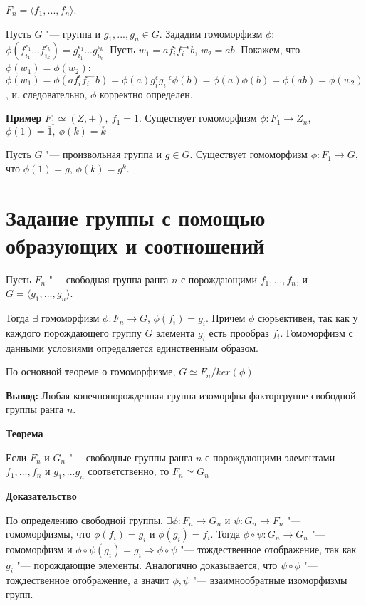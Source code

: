 \documentclass{article}
\begin{document}
$F_n = \langle f_1, ..., f_n \rangle$.

Пусть $G$ "--- группа и $g_1, ..., g_n \in G$. Зададим гомоморфизм $\phi$: $\phi(f_{i_1}^{\epsilon_1}...f_{i_k}^{\epsilon_k}) = g_{i_1}^{\epsilon_1}...g_{i_k}^{\epsilon_k}$. Пусть $w_1 = af_i^{\epsilon}f_i^{-\epsilon}b$, $w_2 = ab$. Покажем, что $\phi(w_1) = \phi(w_2)$: $\phi(w_1) = \phi(af_i^{\epsilon}f_i^{-\epsilon}b) = \phi(a)g_i^{\epsilon}g_i^{-\epsilon}\phi(b) = \phi(a)\phi(b) = \phi(ab) = \phi(w_2)$, и, следовательно, $\phi$ корректно определен.

\vspace{10pt}

\textbf{Пример}
$F_1 \simeq (Z, +), \  f_1 = 1$. Существует гомоморфизм $\phi: F_1 \rightarrow Z_n$, $\phi(1) = \overline{1}, \  \phi(k) = \overline{k}$

Пусть $G$ "--- произвольная группа и $g \in G$. Существует гомоморфизм $\phi: F_1 \rightarrow G$, что $\phi(1) = g$, $\phi(k) = g^k$.

\section{Задание группы с помощью образующих и соотношений}

Пусть $F_n$ "--- свободная группа ранга $n$ с порождающими $f_1, ..., f_n$, и $G = \langle g_1, ..., g_n \rangle$.

Тогда $\exists$ гомоморфизм $\phi: F_n \rightarrow G$, $\phi(f_i) = g_i$. Причем $\phi$ сюрьективен, так как у каждого порождающего группу $G$ элемента $g_i$ есть прообраз $f_i$. Гомоморфизм с данными условиями определяется единственным образом.

По основной теореме о гомоморфизме, $G \simeq F_n/ker(\phi)$

\textbf{Вывод:} Любая конечнопорожденная группа изоморфна факторгруппе свободной группы ранга $n$.

\vspace{10pt}

\textbf{Теорема}

Если $F_n$ и $G_n$ "--- свободные группы ранга $n$ с порождающими элементами $f_1, ..., f_n$ и $g_1, ... g_n$ соответственно, то $F_n \simeq G_n$

\textbf{Доказательство}

По определению свободной группы, $\exists \phi: F_n \rightarrow G_n$ и $\psi: G_n \rightarrow F_n$ "--- гомоморфизмы, что $\phi(f_i) = g_i$ и $\phi(g_i) = f_i$. Тогда $\phi \circ \psi: G_n \rightarrow G_n$ "--- гомоморфизм и $\phi \circ \psi(g_i) = g_i \Rightarrow \phi \circ \psi$ "--- тождественное отображение, так как $g_i$ "--- порождающие элементы. Аналогично доказывается, что $\psi \circ \phi$ "--- тождественное отображение, а значит $\phi, \psi$ "--- взаимнообратные изоморфизмы групп.
\end{document}
